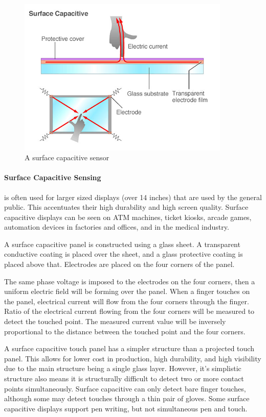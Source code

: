 \documentclass[11pt]{report}
\begin{document}
 
\begin{center}
\begin{figure}
\includegraphics[width=0.9\textwidth]{surcap}
\caption{A surface capacitive sensor}
\end{figure}
\end{center}

\paragraph{Surface Capacitive Sensing}

is often used for larger sized displays (over 14 inches) that are used by the general public.
This accentuates their high durability and high screen quality.
Surface capacitive displays can be seen on ATM machines, ticket kiosks, arcade games, automation devices in factories and offices, and in the medical industry.

A surface capacitive panel is constructed using a glass sheet. 
A transparent conductive coating is placed over the sheet, and a glass protective coating is placed above that. 
Electrodes are placed on the four corners of the panel. 

The same phase voltage is imposed to the electrodes on the four corners, then a uniform electric field will be forming over the panel. 
When a finger touches on the panel, electrical current will flow from the four corners through the finger. 
Ratio of the electrical current flowing from the four corners will be measured to detect the touched point. 
The measured current value will be inversely proportional to the distance between the touched point and the four corners.

A surface capacitive touch panel has a simpler structure than a projected touch panel.
This allows for lower cost in production, high durability, and high visibility due to the main structure being a single glass layer. 
However, it's simplistic structure also means it is structurally difficult to detect two or more contact points simultaneously.
Surface capacitive can only detect bare finger touches, although some may detect touches through a thin pair of gloves.
Some surface capacitive displays support pen writing, but not simultaneous pen and touch.
\end{document}
